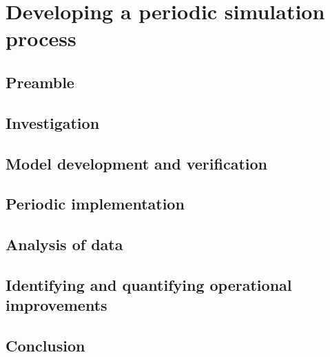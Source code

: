 \chapter{Developing a periodic simulation process}
\section{Preamble}
\section{Investigation}
\section{Model development and verification}
\section{Periodic implementation}
\section{Analysis of data}
\section{Identifying and quantifying operational improvements}
\section{Conclusion}